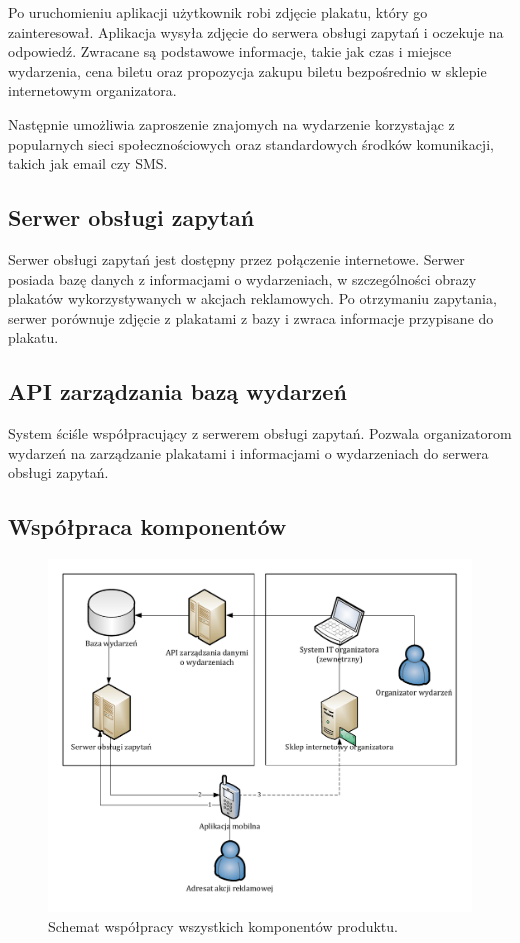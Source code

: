 \documentclass[10pt]{dokument-ppi}
\begin{document}
Po uruchomieniu aplikacji użytkownik robi zdjęcie plakatu, który go
zainteresował. Aplikacja wysyła zdjęcie do serwera obsługi zapytań i oczekuje na
odpowiedź. Zwracane są podstawowe informacje, takie jak czas i miejsce
wydarzenia, cena biletu oraz propozycja zakupu biletu bezpośrednio w sklepie
internetowym organizatora.

Następnie umożliwia zaproszenie znajomych na wydarzenie korzystając z
popularnych sieci społecznościowych oraz standardowych środków komunikacji,
takich jak email czy SMS.

\subsection{Serwer obsługi zapytań}
Serwer obsługi zapytań jest dostępny przez połączenie internetowe. Serwer
posiada bazę danych z informacjami o wydarzeniach, w szczególności obrazy
plakatów wykorzystywanych w akcjach reklamowych. Po otrzymaniu zapytania,
serwer porównuje zdjęcie z plakatami z bazy i zwraca informacje przypisane do
plakatu.

\subsection{API zarządzania bazą wydarzeń}
System ściśle współpracujący z serwerem obsługi zapytań. Pozwala organizatorom
wydarzeń na zarządzanie plakatami i informacjami o wydarzeniach do serwera
obsługi zapytań.

\subsection{Współpraca komponentów}
\begin{figure}[h!]
    \includegraphics[width=\textwidth]{./figury/schemat-komponentow}
    \caption{Schemat współpracy wszystkich komponentów produktu.}
    \label{fig:schemat_komponentow}
\end{figure}
\end{document}
